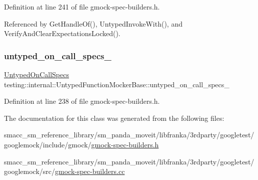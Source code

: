 Definition at line 241 of file gmock-\/spec-\/builders.\+h.



Referenced by Get\+Handle\+Of(), Untyped\+Invoke\+With(), and Verify\+And\+Clear\+Expectations\+Locked().

\mbox{\label{classtesting_1_1internal_1_1UntypedFunctionMockerBase_aed2a1913f6c03fd47c8900039556be34}} 
\subsubsection{\texorpdfstring{untyped\+\_\+on\+\_\+call\+\_\+specs\+\_\+}{untyped\_on\_call\_specs\_}}
{\footnotesize\ttfamily \hyperlink{classtesting_1_1internal_1_1UntypedFunctionMockerBase_a29cc87ed60ad0218432aa777abba7dbb}{Untyped\+On\+Call\+Specs} testing\+::internal\+::\+Untyped\+Function\+Mocker\+Base\+::untyped\+\_\+on\+\_\+call\+\_\+specs\+\_\+\hspace{0.3cm}{\ttfamily [protected]}}



Definition at line 238 of file gmock-\/spec-\/builders.\+h.



The documentation for this class was generated from the following files\+:\begin{DoxyCompactItemize}
\item 
smacc\+\_\+sm\+\_\+reference\+\_\+library/sm\+\_\+panda\+\_\+moveit/libfranka/3rdparty/googletest/googlemock/include/gmock/\hyperlink{gmock-spec-builders_8h}{gmock-\/spec-\/builders.\+h}\item 
smacc\+\_\+sm\+\_\+reference\+\_\+library/sm\+\_\+panda\+\_\+moveit/libfranka/3rdparty/googletest/googlemock/src/\hyperlink{gmock-spec-builders_8cc}{gmock-\/spec-\/builders.\+cc}\end{DoxyCompactItemize}
